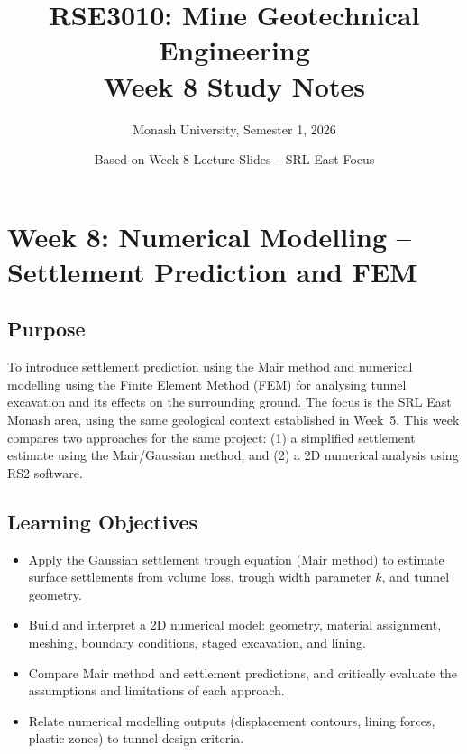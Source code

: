 \documentclass[a4paper,12pt]{article}
\title{\textbf{RSE3010: Mine Geotechnical Engineering} \\ Week 8 Study Notes}
\author{Monash University, Semester 1, 2026}
\date{Based on Week 8 Lecture Slides -- SRL East Focus}
\begin{document}
\maketitle

\section{Week 8: Numerical Modelling -- Settlement Prediction and FEM}

\subsection{Purpose}
To introduce settlement prediction using the Mair method and numerical modelling using the Finite Element Method (FEM) for analysing tunnel excavation and its effects on the surrounding ground. The focus is the SRL East Monash area, using the same geological context established in Week~5. This week compares two approaches for the same project: (1) a simplified settlement estimate using the Mair/Gaussian method, and (2) a 2D numerical analysis using RS2 software.

\subsection{Learning Objectives}
\begin{itemize}
    \item Apply the Gaussian settlement trough equation (Mair method) to estimate surface settlements from volume loss, trough width parameter $k$, and tunnel geometry.
    \item Build and interpret a 2D numerical model: geometry, material assignment, meshing, boundary conditions, staged excavation, and lining.
    \item Compare Mair method and settlement predictions, and critically evaluate the assumptions and limitations of each approach.
    \item Relate numerical modelling outputs (displacement contours, lining forces, plastic zones) to tunnel design criteria.
\end{itemize}
\end{document}
